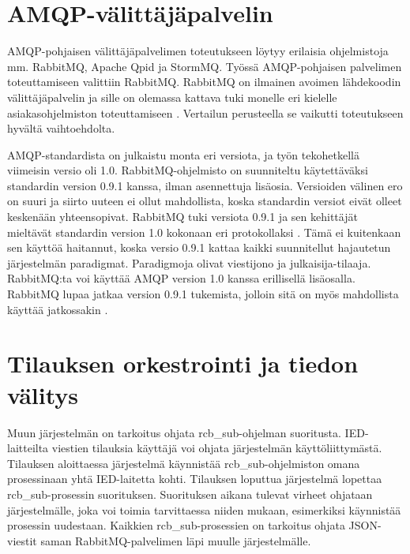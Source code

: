 

\section{AMQP-välittäjäpalvelin}
AMQP-pohjaisen välittäjäpalvelimen toteutukseen löytyy erilaisia ohjelmistoja mm. RabbitMQ, Apache Qpid ja StormMQ. Työssä AMQP-pohjaisen palvelimen toteuttamiseen valittiin RabbitMQ. RabbitMQ on ilmainen avoimen lähdekoodin välittäjäpalvelin ja sille on olemassa kattava tuki monelle eri kielelle asiakasohjelmiston toteuttamiseen \cite{rabbitmq-supported-languages}. Vertailun perusteella se vaikutti toteutukseen hyvältä vaihtoehdolta.

AMQP-standardista on julkaistu monta eri versiota, ja työn tekohetkellä viimeisin versio oli 1.0. RabbitMQ-ohjelmisto on suunniteltu käytettäväksi standardin version 0.9.1 kanssa, ilman asennettuja lisäosia. Versioiden välinen ero on suuri ja siirto uuteen ei ollut mahdollista, koska standardin versiot eivät olleet keskenään yhteensopivat. RabbitMQ tuki versiota 0.9.1 ja sen kehittäjät mieltävät standardin version 1.0 kokonaan eri protokollaksi \cite{RabbitMQ-Compatibility-and-Conformance}. Tämä ei kuitenkaan sen käyttöä haitannut, koska versio 0.9.1 kattaa kaikki suunnitellut hajautetun järjestelmän paradigmat. Paradigmoja olivat viestijono ja julkaisija-tilaaja. RabbitMQ:ta voi käyttää AMQP version 1.0 kanssa erillisellä lisäosalla. RabbitMQ lupaa jatkaa version 0.9.1 tukemista, jolloin sitä on myös mahdollista käyttää jatkossakin \cite{RabbitMQ-Compatibility-and-Conformance}.


\section{Tilauksen orkestrointi ja tiedon välitys}
Muun järjestelmän on tarkoitus ohjata rcb\_sub-ohjelman suoritusta. IED-laitteilta viestien tilauksia käyttäjä voi ohjata järjestelmän käyttöliittymästä. Tilauksen aloittaessa järjestelmä käynnistää rcb\_sub-ohjelmiston omana prosessinaan yhtä IED-laitetta kohti. Tilauksen loputtua järjestelmä lopettaa rcb\_sub-prosessin suorituksen. Suorituksen aikana tulevat virheet ohjataan järjestelmälle, joka voi toimia tarvittaessa niiden mukaan, esimerkiksi käynnistää prosessin uudestaan. Kaikkien rcb\_sub-prosessien on tarkoitus ohjata JSON-viestit saman RabbitMQ-palvelimen läpi muulle järjestelmälle.

